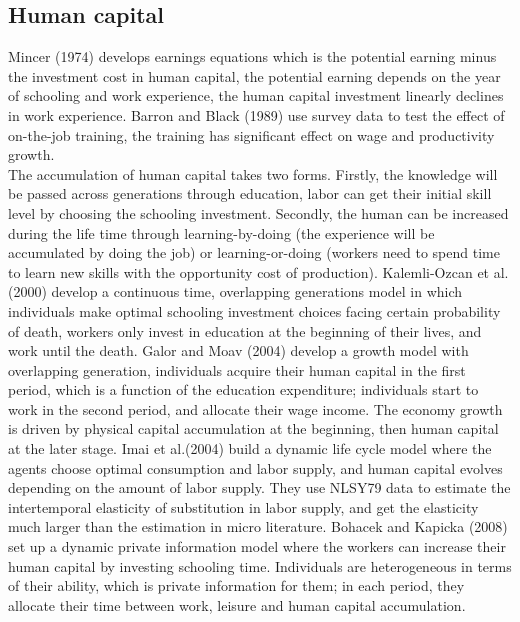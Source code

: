 \documentclass{article}
\newcommand{\1}{\mathbb{1}}
\begin{document}
\subsection{Human capital}
Mincer (1974)\cite{Mincer1974} develops earnings equations which is the potential earning minus the investment cost in human capital, the potential earning depends on the year of schooling and work experience, the human capital investment linearly declines in work experience. 
Barron and Black (1989)\cite{BarronBlack1989} use survey data to test the effect of on-the-job training, the training has significant effect on wage and productivity growth. \\

The accumulation of human capital takes two forms. Firstly, the knowledge will be passed across generations through education, labor can get their initial skill level by choosing the schooling investment. Secondly, the human can be increased during the life time through learning-by-doing (the experience will be accumulated by doing the job) or learning-or-doing (workers need to spend time to learn new skills with the opportunity cost of production). 
Kalemli-Ozcan et al.(2000)\cite{Kalemli-Ozcanetal2000} develop a continuous time, overlapping generations model in which individuals make optimal schooling investment choices facing certain probability of death, workers only invest in education at the beginning of their lives, and work until the death. 
Galor and Moav (2004)\cite{GalorMoav2004} develop a growth model with overlapping generation, individuals acquire their human capital in the first period, which is a function of the education expenditure; individuals start to work in the second period, and allocate their wage income. The economy growth is driven by physical capital accumulation at the beginning, then human capital at the later stage. 
Imai et al.(2004)\cite{Imaietal2004} build a dynamic life cycle model where the agents choose optimal consumption and labor supply, and human capital evolves depending on the amount of labor supply. They use NLSY79 data to estimate the intertemporal elasticity of substitution in labor supply, and get the elasticity much larger than the estimation in micro literature. 
Bohacek and Kapicka (2008)\cite{BohacekKapicka2008} set up a dynamic private information model where the workers can increase their human capital by investing schooling time. Individuals are heterogeneous in terms of their ability, which is private information for them; in each period, they allocate their time between work, leisure and human capital accumulation.  \\
\end{document}
